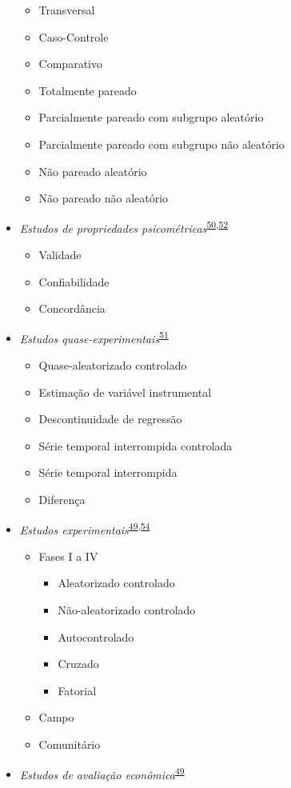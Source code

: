 \documentclass[
]{book}
\begin{document}
\begin{itemize}
  \begin{itemize}
  \item
    Transversal
  \item
    Caso-Controle
  \item
    Comparativo
  \item
    Totalmente pareado
  \item
    Parcialmente pareado com subgrupo aleatório
  \item
    Parcialmente pareado com subgrupo não aleatório
  \item
    Não pareado aleatório
  \item
    Não pareado não aleatório
  \end{itemize}
\item
  \emph{Estudos de propriedades psicométricas}\textsuperscript{\protect\hyperlink{ref-Souza2017}{50},\protect\hyperlink{ref-echevarruxeda-guanilo2019}{52}}

  \begin{itemize}
  \item
    Validade
  \item
    Confiabilidade
  \item
    Concordância
  \end{itemize}
\item
  \emph{Estudos quase-experimentais}\textsuperscript{\protect\hyperlink{ref-reeves2017}{51}}

  \begin{itemize}
  \item
    Quase-aleatorizado controlado
  \item
    Estimação de variável instrumental
  \item
    Descontinuidade de regressão
  \item
    Série temporal interrompida controlada
  \item
    Série temporal interrompida
  \item
    Diferença
  \end{itemize}
\item
  \emph{Estudos experimentais}\textsuperscript{\protect\hyperlink{ref-Suxfct2014}{49},\protect\hyperlink{ref-Chidambaram2019}{54}}

  \begin{itemize}
  \item
    Fases I a IV

    \begin{itemize}
    \item
      Aleatorizado controlado
    \item
      Não-aleatorizado controlado
    \item
      Autocontrolado
    \item
      Cruzado
    \item
      Fatorial
    \end{itemize}
  \item
    Campo
  \item
    Comunitário
  \end{itemize}
\item
  \emph{Estudos de avaliação econômica}\textsuperscript{\protect\hyperlink{ref-Suxfct2014}{49}}


\end{itemize}
\end{document}
